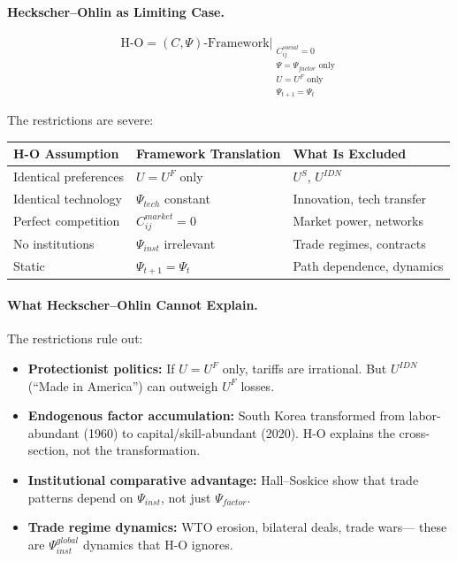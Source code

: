 \documentclass[12pt,a4paper]{article}
\begin{document}
\paragraph{Heckscher--Ohlin as Limiting Case.}
\begin{equation}
  \text{H-O} = (C, \Psi)\text{-Framework} \Big|_{\substack{
    C_{ij}^{social} = 0 \\
    \Psi = \Psi_{factor} \text{ only} \\
    U = U^F \text{ only} \\
    \Psi_{t+1} = \Psi_t
  }}
\end{equation}

The restrictions are severe:
\begin{center}
\renewcommand{\arraystretch}{1.2}
\begin{tabular}{lll}
\hline
\textbf{H-O Assumption} & \textbf{Framework Translation} & \textbf{What Is Excluded} \\
\hline
Identical preferences & $U = U^F$ only & $U^S$, $U^{IDN}$ \\
Identical technology & $\Psi_{tech}$ constant & Innovation, tech transfer \\
Perfect competition & $C_{ij}^{market} = 0$ & Market power, networks \\
No institutions & $\Psi_{inst}$ irrelevant & Trade regimes, contracts \\
Static & $\Psi_{t+1} = \Psi_t$ & Path dependence, dynamics \\
\hline
\end{tabular}
\end{center}

\paragraph{What Heckscher--Ohlin Cannot Explain.}
The restrictions rule out:
\begin{itemize}
  \item \textbf{Protectionist politics:} If $U = U^F$ only, tariffs are irrational.
        But $U^{IDN}$ (``Made in America'') can outweigh $U^F$ losses.
  \item \textbf{Endogenous factor accumulation:} South Korea transformed from
        labor-abundant (1960) to capital/skill-abundant (2020).
        H-O explains the cross-section, not the transformation.
  \item \textbf{Institutional comparative advantage:} Hall--Soskice show that
        trade patterns depend on $\Psi_{inst}$, not just $\Psi_{factor}$.
  \item \textbf{Trade regime dynamics:} WTO erosion, bilateral deals, trade wars---
        these are $\Psi_{inst}^{global}$ dynamics that H-O ignores.
\end{itemize}
\end{document}
